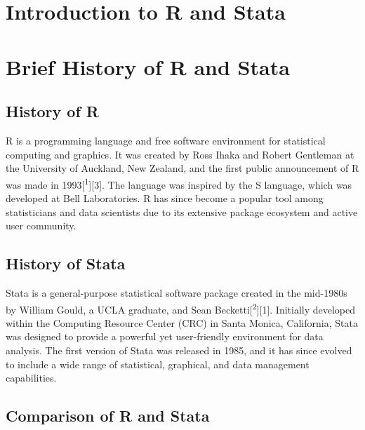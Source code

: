 \documentclass[
  letterpaper,
  DIV=11,
  numbers=noendperiod]{scrreprt}
\begin{document}

\chapter{Introduction to R and Stata}\label{introduction-to-r-and-stata}


\chapter{Brief History of R and
Stata}\label{brief-history-of-r-and-stata}

\section{History of R}\label{history-of-r}

R is a programming language and free software environment for
statistical computing and graphics. It was created by Ross Ihaka and
Robert Gentleman at the University of Auckland, New Zealand, and the
first public announcement of R was made in
1993{[}\textsuperscript{1}{]}{[}3{]}. The language was inspired by the S
language, which was developed at Bell Laboratories. R has since become a
popular tool among statisticians and data scientists due to its
extensive package ecosystem and active user community.

\section{History of Stata}\label{history-of-stata}

Stata is a general-purpose statistical software package created in the
mid-1980s by William Gould, a UCLA graduate, and Sean
Becketti{[}\textsuperscript{2}{]}{[}1{]}. Initially developed within the
Computing Resource Center (CRC) in Santa Monica, California, Stata was
designed to provide a powerful yet user-friendly environment for data
analysis. The first version of Stata was released in 1985, and it has
since evolved to include a wide range of statistical, graphical, and
data management capabilities.

\section{Comparison of R and Stata}\label{comparison-of-r-and-stata}
\end{document}
